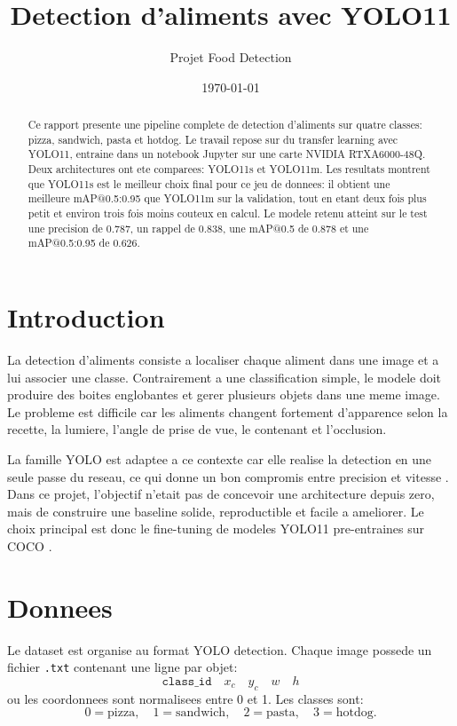 \documentclass[11pt,a4paper]{article}
\title{Detection d'aliments avec YOLO11}
\author{Projet Food Detection}
\date{\today}
\begin{document}
\sloppy
\maketitle

\begin{abstract}
Ce rapport presente une pipeline complete de detection d'aliments sur quatre classes:
pizza, sandwich, pasta et hotdog. Le travail repose sur du transfer learning avec
YOLO11, entraine dans un notebook Jupyter sur une carte NVIDIA RTXA6000-48Q. Deux
architectures ont ete comparees: YOLO11s et YOLO11m. Les resultats montrent que
YOLO11s est le meilleur choix final pour ce jeu de donnees: il obtient une meilleure
mAP@0.5:0.95 que YOLO11m sur la validation, tout en etant deux fois plus petit et
environ trois fois moins couteux en calcul. Le modele retenu atteint sur le test
une precision de 0.787, un rappel de 0.838, une mAP@0.5 de 0.878 et une
mAP@0.5:0.95 de 0.626.
\end{abstract}

\section{Introduction}
La detection d'aliments consiste a localiser chaque aliment dans une image et a lui
associer une classe. Contrairement a une classification simple, le modele doit
produire des boites englobantes et gerer plusieurs objets dans une meme image. Le
probleme est difficile car les aliments changent fortement d'apparence selon la
recette, la lumiere, l'angle de prise de vue, le contenant et l'occlusion.

La famille YOLO est adaptee a ce contexte car elle realise la detection en une seule
passe du reseau, ce qui donne un bon compromis entre precision et vitesse
\cite{redmon2016yolo}. Dans ce projet, l'objectif n'etait pas de concevoir une
architecture depuis zero, mais de construire une baseline solide, reproductible et
facile a ameliorer. Le choix principal est donc le fine-tuning de modeles YOLO11
pre-entraines sur COCO \cite{ultralytics_yolo11}.

\section{Donnees}
Le dataset est organise au format YOLO detection. Chaque image possede un fichier
\texttt{.txt} contenant une ligne par objet:
\[
\texttt{class\_id}\quad x_c\quad y_c\quad w\quad h
\]
ou les coordonnees sont normalisees entre 0 et 1. Les classes sont:
\[
0=\text{pizza},\quad 1=\text{sandwich},\quad 2=\text{pasta},\quad 3=\text{hotdog}.
\]
\end{document}
